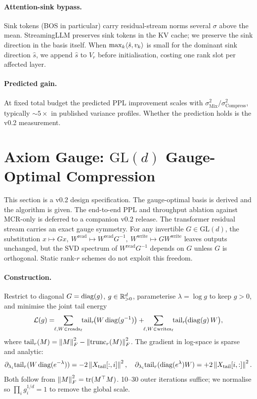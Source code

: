 \documentclass[11pt]{article}
\begin{document}
\paragraph{Attention-sink bypass.}  Sink tokens (BOS in particular) carry
residual-stream norms several $\sigma$ above the mean.  StreamingLLM
\cite{xiao2023streamingllm} preserves sink tokens in the KV cache; we
preserve the sink direction in the basis itself.  When
$\max_k\langle \hat s, v_k \rangle$ is small for the dominant sink direction
$\hat s$, we append $\hat s$ to $V_r$ before initialisation, costing one
rank slot per affected layer.

\paragraph{Predicted gain.}  At fixed total budget the predicted PPL
improvement scales with $\sigma^2_\text{Mix}/\sigma^2_\text{Compress}$,
typically $\sim 5\times$ in published variance profiles.  Whether the
prediction holds is the v0.2 measurement.

\section{Axiom Gauge: $\mathrm{GL}(d)$ Gauge-Optimal Compression}
\label{sec:gauge}
This section is a v0.2 design specification. The gauge-optimal basis is derived and the algorithm is given. The end-to-end PPL and throughput ablation against MCR-only is deferred to a companion v0.2 release.
The transformer residual stream carries an exact gauge symmetry.  For any
invertible $G\in\mathrm{GL}(d)$, the substitution
$x\!\mapsto\!Gx,\ W^\text{read}\!\mapsto\!W^\text{read}G^{-1},\
W^\text{write}\!\mapsto\!GW^\text{write}$ leaves outputs unchanged, but
the SVD spectrum of $W^\text{read}G^{-1}$ depends on $G$ unless $G$ is
orthogonal.  Static rank-$r$ schemes do not exploit this freedom.

\paragraph{Construction.}  Restrict to diagonal $G=\operatorname{diag}(g)$, $g\in\mathbb{R}^d_{>0}$,
parameterise $\lambda=\log g$ to keep $g>0$, and minimise the joint tail
energy
\[
\mathcal{L}(g)=\!\!\sum_{\ell,W\in\text{reads}_\ell}\!\!\mathrm{tail}_r\!\bigl(W\diag(g^{-1})\bigr)
+\!\!\sum_{\ell,W\in\text{writes}_\ell}\!\!\mathrm{tail}_r\!\bigl(\diag(g)\,W\bigr),
\]
where $\mathrm{tail}_r(M)=\left\lVert M \right\rVert_F^2-\left\lVert \mathrm{trunc}_r(M) \right\rVert_F^2$.  The
gradient in log-space is sparse and analytic:
\[
\partial_{\lambda_i}\mathrm{tail}_r(W\operatorname{diag}(e^{-\lambda}))=-2\left\lVert X_\text{tail}[:,i] \right\rVert^2,\quad
\partial_{\lambda_i}\mathrm{tail}_r(\operatorname{diag}(e^{\lambda})W)=+2\left\lVert X_\text{tail}[i,:] \right\rVert^2.
\]
Both follow from $\left\lVert M \right\rVert_F^2=\operatorname{tr}(M^\top M)$.  10--30 outer iterations
suffice; we normalise so $\prod_i g_i^{1/d}=1$ to remove the global scale.
\end{document}
